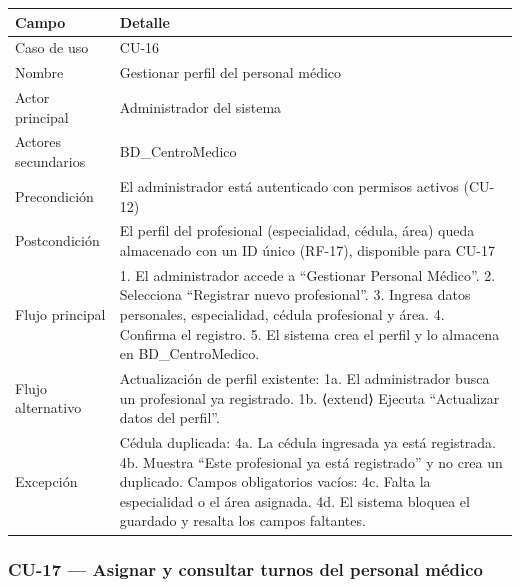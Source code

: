 \documentclass[11pt,a4paper]{article}
\begin{document}
	\begin{longtable}{p{} p{} }
		
		
		\toprule
		\textbf{Campo} &
		\textbf{Detalle}  \\
		\midrule
		\endhead
		
		Caso de uso & CU-16 \\
		Nombre & Gestionar perfil del personal médico \\
		Actor principal & Administrador del sistema \\
		Actores secundarios & BD\_CentroMedico \\
		Precondición & El administrador está autenticado con permisos activos (CU-12) \\
		Postcondición & El perfil del profesional (especialidad, cédula, área) queda almacenado con un ID único (RF-17), disponible para CU-17 \\
		Flujo principal & 1. El administrador accede a ``Gestionar Personal Médico''. 2. Selecciona ``Registrar nuevo profesional''. 3. Ingresa datos personales, especialidad, cédula profesional y área. 4. Confirma el registro. 5. El sistema crea el perfil y lo almacena en BD\_CentroMedico. \\
		Flujo alternativo & Actualización de perfil existente: 1a. El administrador busca un profesional ya registrado. 1b. ⟨extend⟩ Ejecuta ``Actualizar datos del perfil''. \\
		Excepción & Cédula duplicada: 4a. La cédula ingresada ya está registrada. 4b. Muestra ``Este profesional ya está registrado'' y no crea un duplicado. Campos obligatorios vacíos: 4c. Falta la especialidad o el área asignada. 4d. El sistema bloquea el guardado y resalta los campos faltantes. \\
		\bottomrule
	\end{longtable}
	
	\subsubsection{CU-17 --- Asignar y consultar turnos del personal médico}
	
\end{document}
